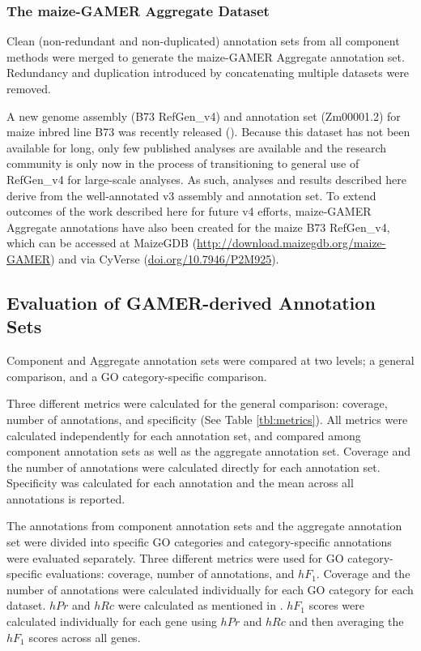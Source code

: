 \subsubsection{The maize-GAMER Aggregate Dataset}
Clean (non-redundant and non-duplicated) annotation sets from all component methods were merged to generate the maize-GAMER Aggregate annotation set. Redundancy and duplication introduced by concatenating multiple datasets were removed.

A new genome assembly (B73 RefGen\_v4) and annotation set (Zm00001.2) for maize inbred line B73 was recently released (\cite{jiao_2017-Dk}). Because this dataset has not been available for long, only few published analyses are available and the research community is only now in the process of transitioning to general use of RefGen\_v4 for large-scale analyses. As such, analyses and results described here derive from the well-annotated v3 assembly and annotation set. To extend outcomes of the work described here for future v4 efforts, maize-GAMER Aggregate annotations have also been created for the maize B73 RefGen\_v4, which can be accessed at MaizeGDB (\href{http://download.maizegdb.org/maize-GAMER}{http://download.maizegdb.org/maize-GAMER}) and via CyVerse (\href{http://doi.org/10.7946/P2M925}{doi.org/10.7946/P2M925}).

\subsection{Evaluation of GAMER-derived Annotation Sets} \label{subsec:game_eval}
Component and Aggregate annotation sets were compared at two levels; a general comparison, and a GO category-specific comparison.

Three different metrics were calculated for the general comparison: coverage, number of annotations, and specificity (See Table \ref{tbl:metrics}). All metrics were calculated independently for each annotation set, and compared among component annotation sets as well as the aggregate annotation set. Coverage and the number of annotations were calculated directly for each annotation set. Specificity was calculated for each annotation and the mean across all annotations is reported.

The annotations from component annotation sets and the aggregate annotation set were divided into specific GO categories and category-specific annotations were evaluated separately. Three different metrics were used for GO category-specific evaluations: coverage, number of annotations, and $hF_1$.  Coverage and the number of annotations were calculated individually for each GO category for each dataset. $hPr$ and $hRc$ were calculated as mentioned in \cite{defoinplatel_2011-rs}. $hF_1$ scores were calculated individually for each gene using $hPr$ and $hRc$ and then averaging the $hF_1$ scores across all genes.

